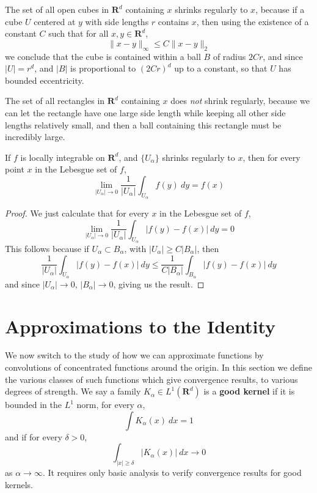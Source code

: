 \begin{example}
    The set of all open cubes in $\mathbf{R}^d$ containing $x$ shrinks regularly to $x$, because if a cube $U$ centered at $y$ with side lengths $r$ contains $x$, then using the existence of a constant $C$ such that for all $x,y \in \mathbf{R}^d$,
    \[ \| x - y \|_\infty \leq C \| x - y \|_2 \]
    we conclude that the cube is contained within a ball $B$ of radius $2Cr$, and since $|U| = r^d$, and $|B|$ is proportional to $(2Cr)^d$ up to a constant, so that $U$ has bounded eccentricity.
\end{example}

\begin{example}
    The set of all rectangles in $\mathbf{R}^d$ containing $x$ does {\it not} shrink regularly, because we can let the rectangle have one large side length while keeping all other side lengths relatively small, and then a ball containing this rectangle must be incredibly large.
\end{example}

\begin{theorem}
    If $f$ is locally integrable on $\mathbf{R}^d$, and $\{ U_\alpha \}$ shrinks regularly to $x$, then for every point $x$ in the Lebesgue set of $f$,
    \[ \lim_{|U_\alpha| \to 0} \frac{1}{|U_\alpha|} \int_{U_\alpha} f(y)\ dy = f(x) \]
\end{theorem}
\begin{proof}
    We just calculate that for every $x$ in the Lebesgue set of $f$,
    \[ \lim_{|U_\alpha| \to 0} \frac{1}{|U_\alpha|} \int_{U_\alpha} |f(y) - f(x)|\ dy = 0 \]
    This follows because if $U_\alpha \subset B_\alpha$, with $|U_\alpha| \geq C|B_\alpha|$, then
    \[ \frac{1}{|U_\alpha|} \int_{U_\alpha} |f(y) - f(x)|\ dy \leq \frac{1}{C|B_\alpha|} \int_{B_\alpha} |f(y) - f(x)|\ dy \]
    and since $|U_\alpha| \to 0$, $|B_\alpha| \to 0$, giving us the result.
\end{proof}

\section{Approximations to the Identity}

We now switch to the study of how we can approximate functions by convolutions of concentrated functions around the origin. In this section we define the various classes of such functions which give convergence results, to various degrees of strength. We say a family $K_\alpha \in L^1(\mathbf{R}^d)$ is a {\bf good kernel} if it is bounded in the $L^1$ norm, for every $\alpha$,
    \[ \int K_\alpha(x)\ dx = 1 \]
    and if for every $\delta > 0$,
    \[ \int_{|x| \geq \delta} |K_\alpha(x)|\ dx \to 0 \]
    as $\alpha \to \infty$.
%
It requires only basic analysis to verify convergence results for good kernels.

